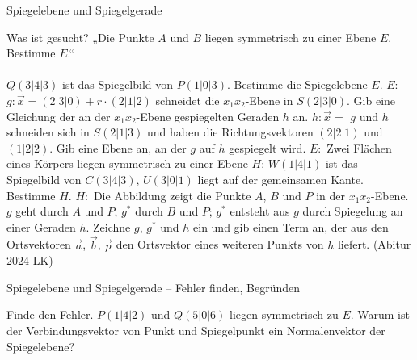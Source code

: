 \setcounter{aufgabe}{12}

\begin{aufgabe}{Spiegelebene und Spiegelgerade}
\begin{teile}
\teil Was ist gesucht? „Die Punkte $A$ und $B$ liegen symmetrisch zu einer Ebene $E$. Bestimme $E$.“ \\  \\ 
\teil $Q(3 | 4 | 3)$ ist das Spiegelbild von $P(1 | 0 | 3)$. Bestimme die Spiegelebene $E$. $E: $ \leerfeld
\teil $g: \vec{x} = (2 | 3 | 0) + r \cdot (2 | 1 | 2)$ schneidet die $x_1x_2$-Ebene in $S(2 | 3 | 0)$. Gib eine Gleichung der an der $x_1x_2$-Ebene gespiegelten Geraden $h$ an. $h: \vec{x} = $ \leerfeld
\teil $g$ und $h$ schneiden sich in $S(2 | 1 | 3)$ und haben die Richtungsvektoren $(2 | 2 | 1)$ und $(1 | 2 | 2)$. Gib eine Ebene an, an der $g$ auf $h$ gespiegelt wird. $E: $ \leerfeld
\teil Zwei Flächen eines Körpers liegen symmetrisch zu einer Ebene $H$; $W(1 | 4 | 1)$ ist das Spiegelbild von $C(3 | 4 | 3)$, $U(3 | 0 | 1)$ liegt auf der gemeinsamen Kante. Bestimme $H$. $H: $ \leerfeld
\teil Die Abbildung zeigt die Punkte $A$, $B$ und $P$ in der $x_1x_2$-Ebene. $g$ geht durch $A$ und $P$, $g^*$ durch $B$ und $P$; $g^*$ entsteht aus $g$ durch Spiegelung an einer Geraden $h$. Zeichne $g$, $g^*$ und $h$ ein und gib einen Term an, der aus den Ortsvektoren $\vec{a}$, $\vec{b}$, $\vec{p}$ den Ortsvektor eines weiteren Punkts von $h$ liefert. \hfill (Abitur 2024 LK)

\begin{ksys}[xmin=-1,xmax=7,ymin=-1,ymax=6]\end{ksys}
\end{teile}
\end{aufgabe}

\begin{aufgabe}{Spiegelebene und Spiegelgerade – Fehler finden, Begründen}
\begin{teile}
\teil Finde den Fehler. $P(1 | 4 | 2)$ und $Q(5 | 0 | 6)$ liegen symmetrisch zu $E$. 
\teil Warum ist der Verbindungsvektor von Punkt und Spiegelpunkt ein Normalenvektor der Spiegelebene?
\end{teile}
\end{aufgabe}
